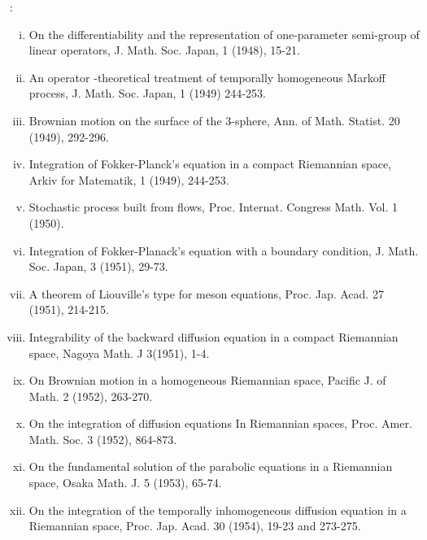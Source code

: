 \begin{thebibliography}{99}
\begin{enumerate}[(i)]
 \end{enumerate}
: 
 \begin{enumerate}[(i)]
 \item On the differentiability and the representation of
  one-parameter semi-group of linear operators, J. Math. Soc. Japan,
  1 (1948), 15-21. 
 \item An operator -theoretical treatment of temporally homogeneous
  Markoff process, J. Math. Soc. Japan, 1 (1949) 244-253. 
 \item Brownian motion on the surface of the 3-sphere, Ann. of
  Math. Statist. 20 (1949), 292-296. 
 \item Integration of Fokker-Planck's equation in a compact
  Riemannian space, Arkiv for Matematik, 1 (1949), 244-253. 
 \item Stochastic process built from flows, Proc. Internat. Congress
  Math. Vol. 1 (1950). 
 \item Integration of Fokker-Planack's equation with a boundary
  condition, J. Math. Soc. Japan, 3 (1951), 29-73. 
 \item A theorem of Liouville's type for meson equations,
  Proc. Jap. Acad. 27 (1951), 214-215. 
 \item Integrability of the backward diffusion equation in a compact
  Riemannian space, Nagoya Math. J 3(1951), 1-4. 
 \item On Brownian motion in a homogeneous Riemannian space, Pacific
  J. of Math. 2 (1952), 263-270. 
 \item On the integration of diffusion equations In Riemannian
  spaces, Proc. Amer. Math. Soc. 3 (1952), 864-873. 
 \item On the fundamental solution of the parabolic equations in a
  Riemannian space, Osaka Math. J. 5 (1953), 65-74. 
 \item On the integration of the temporally inhomogeneous diffusion
  equation in a Riemannian space, Proc. Jap. Acad. 30 (1954), 19-23
  and 273-275. 
 \end{enumerate}
\end{thebibliography}


